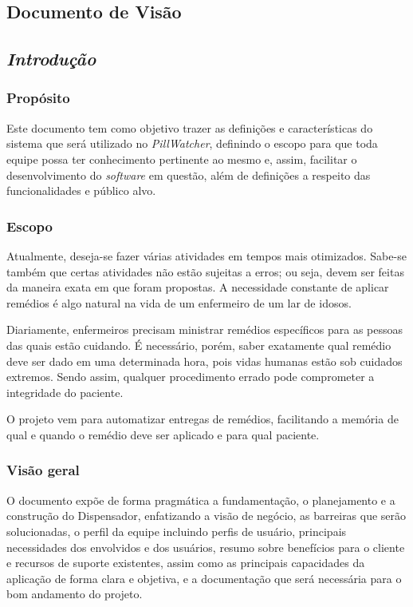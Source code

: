\begin{apendicesenv}
\chapter{Documento de Visão}

\section{\textit{Introdução}}

\subsection*{Propósito}

Este documento tem como objetivo trazer as definições e características do sistema
que será utilizado no \textit{PillWatcher}, definindo o escopo para que toda equipe possa ter conhecimento pertinente ao mesmo e, assim, facilitar o desenvolvimento do \textit{software} em questão, além de definições a respeito das funcionalidades e público alvo.

\subsection*{Escopo}

Atualmente, deseja-se fazer várias atividades em tempos mais otimizados. Sabe-se também que certas atividades não estão sujeitas a erros; ou seja, devem ser feitas da maneira exata em que foram propostas. A necessidade constante de aplicar remédios é algo natural na vida de um enfermeiro de um lar de idosos.

Diariamente, enfermeiros precisam ministrar remédios específicos para as pessoas das quais estão cuidando. É necessário, porém, saber exatamente qual remédio deve ser dado em uma determinada hora, pois vidas humanas estão sob cuidados extremos. Sendo assim, qualquer procedimento errado pode comprometer a integridade do paciente.

O projeto vem para automatizar entregas de remédios, facilitando a memória de qual e quando o remédio deve ser aplicado e para qual paciente.

\subsection*{Visão geral}

O documento expõe de forma pragmática a fundamentação, o planejamento e a construção do Dispensador, enfatizando a visão de negócio, as barreiras que serão solucionadas, o perfil da equipe incluindo perfis de usuário, principais necessidades dos envolvidos e dos usuários, resumo sobre benefícios para o cliente e recursos de suporte existentes, assim como as principais capacidades da aplicação de forma clara e objetiva, e a documentação que será necessária para o bom andamento do projeto.


\end{apendicesenv}

